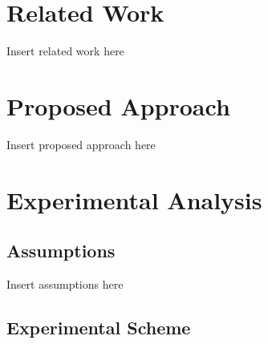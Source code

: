 \documentclass[conference]{IEEEtran}
\begin{document}

\section{Related Work}

Insert related work here


\section{Proposed Approach}

Insert proposed approach here


\section{Experimental Analysis}


\subsection{Assumptions}

Insert assumptions here


\subsection{Experimental Scheme}
\end{document}

